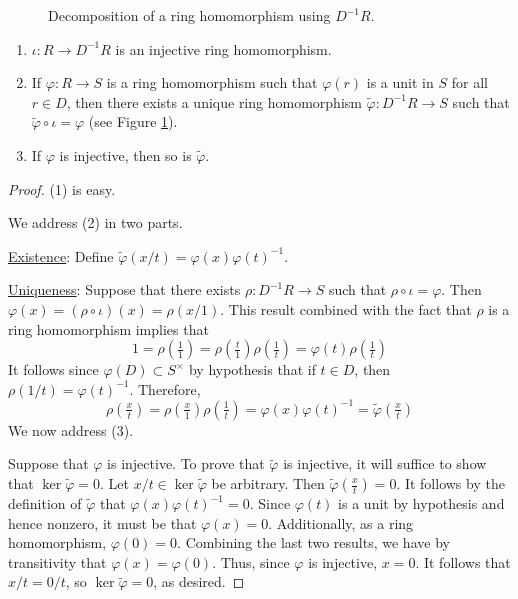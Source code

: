 \documentclass[../notes.tex]{subfiles}
\begin{document}
\begin{itemize}
\begin{figure}[H]
        \caption{Decomposition of a ring homomorphism using $D^{-1}R$.}
        \label{fig:fracDecomp}
    \end{figure}
    \begin{enumerate}[label={(\arabic*)}]
        \item $\iota:R\to D^{-1}R$ is an injective ring homomorphism.
        \item If $\varphi:R\to S$ is a ring homomorphism such that $\varphi(r)$ is a unit in $S$ for all $r\in D$, then there exists a unique ring homomorphism $\tilde{\varphi}:D^{-1}R\to S$ such that $\tilde{\varphi}\circ\iota=\varphi$ (see Figure \ref{fig:fracDecomp}).
        \item If $\varphi$ is injective, then so is $\tilde{\varphi}$.
    \end{enumerate}
    \begin{proof}
        (1) is easy.\par\smallskip
        We address (2) in two parts.\par
        \underline{Existence}: Define $\tilde{\varphi}(x/t)=\varphi(x)\varphi(t)^{-1}$.\par
        \underline{Uniqueness}: Suppose that there exists $\rho:D^{-1}R\to S$ such that $\rho\circ\iota=\varphi$. Then $\varphi(x)=(\rho\circ\iota)(x)=\rho(x/1)$. This result combined with the fact that $\rho$ is a ring homomorphism implies that
        \begin{equation*}
            1 = \rho(\tfrac{1}{1})
            = \rho(\tfrac{t}{1})\rho(\tfrac{1}{t})
            = \varphi(t)\rho(\tfrac{1}{t})
        \end{equation*}
        It follows since $\varphi(D)\subset S^\times$ by hypothesis that if $t\in D$, then $\rho(1/t)=\varphi(t)^{-1}$. Therefore,
        \begin{equation*}
            \rho(\tfrac{x}{t}) = \rho(\tfrac{x}{1})\rho(\tfrac{1}{t})
            = \varphi(x)\varphi(t)^{-1}
            = \tilde{\varphi}(\tfrac{x}{t})
        \end{equation*}\smallskip
        We now address (3).\par
        Suppose that $\varphi$ is injective. To prove that $\tilde{\varphi}$ is injective, it will suffice to show that $\ker\tilde{\varphi}=0$. Let $x/t\in\ker\tilde{\varphi}$ be arbitrary. Then $\tilde{\varphi}(\tfrac{x}{t})=0$. It follows by the definition of $\tilde{\varphi}$ that $\varphi(x)\varphi(t)^{-1}=0$. Since $\varphi(t)$ is a unit by hypothesis and hence nonzero, it must be that $\varphi(x)=0$. Additionally, as a ring homomorphism, $\varphi(0)=0$. Combining the last two results, we have by transitivity that $\varphi(x)=\varphi(0)$. Thus, since $\varphi$ is injective, $x=0$. It follows that $x/t=0/t$, so $\ker\tilde{\varphi}=0$, as desired.

\end{proof}
\end{itemize}
\end{document}
